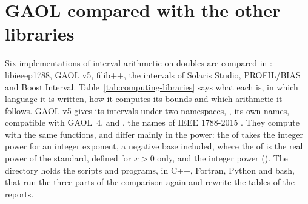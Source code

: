 \documentclass[12pt,a4paper,twoside,openright]{book}
\begin{document}
\section{GAOL compared with the other libraries}
\label{sec:comparison}
%
%

Six implementations of interval arithmetic on doubles are compared in
: libieeep1788, GAOL v5, filib++, the intervals of
Solaris Studio, PROFIL/BIAS and Boost.Interval.
Table~\ref{tab:computing-libraries} says what each is, in which language it
is written, how it computes its bounds and which arithmetic it follows.
GAOL v5 gives its intervals under two namespaces, , its own
names, compatible with GAOL~4, and , the names of IEEE
1788-2015 \cite{IEEE1788:2015}. They compute with the same functions, and
differ mainly in the power: the  of  takes the integer
power for an integer exponent, a negative base included, where the
 of  is the real power of the standard,
defined for $x > 0$ only, and  the integer power
(). The directory  holds
the scripts and programs, in C++, Fortran, Python and bash, that run the
three parts of the comparison again and rewrite the tables of the reports.
\end{document}
